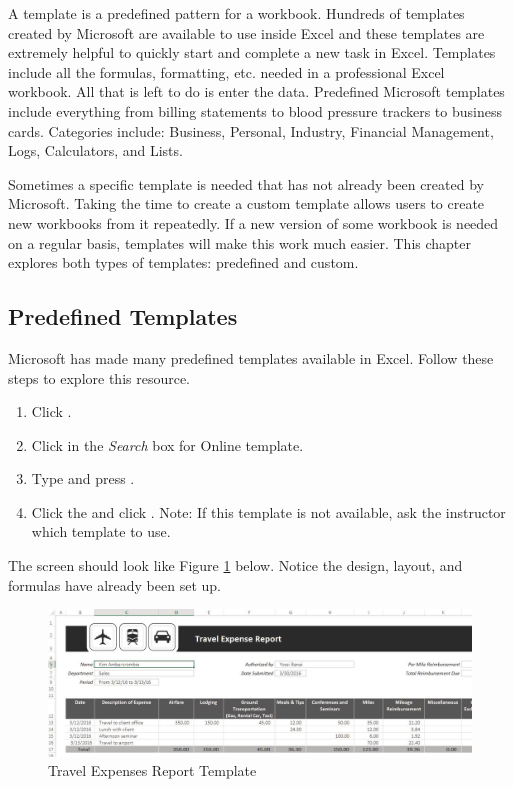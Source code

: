 A template is a predefined pattern for a workbook. Hundreds of templates created by Microsoft are available to use inside Excel and these templates are extremely helpful to quickly start and complete a new task in Excel. Templates include all the formulas, formatting, etc. needed in a professional Excel workbook. All that is left to do is enter the data. Predefined Microsoft templates include everything from billing statements to blood pressure trackers to business cards. Categories include: Business, Personal, Industry, Financial Management, Logs, Calculators, and Lists.

Sometimes a specific template is needed that has not already been created by Microsoft. Taking the time to create a custom template allows users to create new workbooks from it repeatedly. If a new version of some workbook is needed on a regular basis, templates will make this work much easier. This chapter explores both types of templates: predefined and custom.

\subsection{Predefined Templates}

Microsoft has made many predefined templates available in Excel. Follow these steps to explore this resource.

\begin{enumerate}
	\item Click .
	\item Click in the \textit{Search} box for Online template.
	\item Type  and press .
	\item Click the  and click . Note: If this template is not available, ask the instructor which template to use.
\end{enumerate}

The screen should look like Figure \ref{06:fig09} below. Notice the design, layout, and formulas have already been set up.

\begin{figure}[H]
	\centering
	\includegraphics[width=\maxwidth{.95\linewidth}]{gfx/ch06_fig09}
	\caption{Travel Expenses Report Template}
	\label{06:fig09}
\end{figure}

